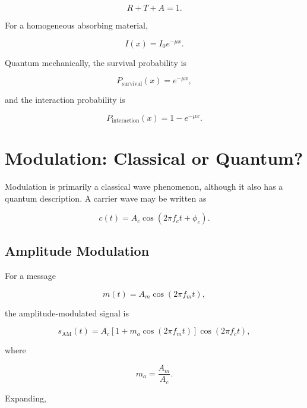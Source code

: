 \documentclass[12pt]{article}
\begin{document}
\begin{equation}
\boxed{R+T+A=1}.
\end{equation}

For a homogeneous absorbing material,

\begin{equation}
\boxed{I(x)=I_0e^{-\mu x}}.
\end{equation}

Quantum mechanically, the survival probability is

\begin{equation}
P_{\text{survival}}(x)=e^{-\mu x},
\end{equation}

and the interaction probability is

\begin{equation}
P_{\text{interaction}}(x)=1-e^{-\mu x}.
\end{equation}

\section{Modulation: Classical or Quantum?}

Modulation is primarily a classical wave phenomenon, although it also has a quantum description. A carrier wave may be written as

\begin{equation}
c(t)=A_c\cos(2\pi f_ct+\phi_c).
\end{equation}

\subsection{Amplitude Modulation}

For a message

\begin{equation}
m(t)=A_m\cos(2\pi f_mt),
\end{equation}

the amplitude-modulated signal is

\begin{equation}
\boxed{
s_{\text{AM}}(t)
=
A_c
\left[
1+m_a\cos(2\pi f_mt)
\right]
\cos(2\pi f_ct)
},
\end{equation}

where

\begin{equation}
m_a=\frac{A_m}{A_c}.
\end{equation}

Expanding,
\end{document}
